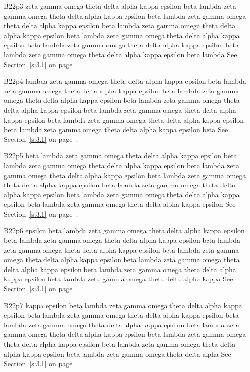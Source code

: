 B22p3 zeta gamma omega theta delta alpha kappa epsilon beta lambda zeta gamma omega theta delta alpha kappa epsilon beta lambda zeta gamma omega theta delta alpha kappa epsilon beta lambda zeta gamma omega theta delta alpha kappa epsilon beta lambda zeta gamma omega theta delta alpha kappa epsilon beta lambda zeta gamma omega theta delta alpha kappa epsilon beta lambda zeta gamma omega theta delta alpha kappa epsilon beta lambda See Section~\ref{s:3.1} on page~\pageref{s:3.1}.

B22p4 lambda zeta gamma omega theta delta alpha kappa epsilon beta lambda zeta gamma omega theta delta alpha kappa epsilon beta lambda zeta gamma omega theta delta alpha kappa epsilon beta lambda zeta gamma omega theta delta alpha kappa epsilon beta lambda zeta gamma omega theta delta alpha kappa epsilon beta lambda zeta gamma omega theta delta alpha kappa epsilon beta lambda zeta gamma omega theta delta alpha kappa epsilon beta See Section~\ref{s:3.1} on page~\pageref{s:3.1}.

B22p5 beta lambda zeta gamma omega theta delta alpha kappa epsilon beta lambda zeta gamma omega theta delta alpha kappa epsilon beta lambda zeta gamma omega theta delta alpha kappa epsilon beta lambda zeta gamma omega theta delta alpha kappa epsilon beta lambda zeta gamma omega theta delta alpha kappa epsilon beta lambda zeta gamma omega theta delta alpha kappa epsilon beta lambda zeta gamma omega theta delta alpha kappa epsilon See Section~\ref{s:3.1} on page~\pageref{s:3.1}.

B22p6 epsilon beta lambda zeta gamma omega theta delta alpha kappa epsilon beta lambda zeta gamma omega theta delta alpha kappa epsilon beta lambda zeta gamma omega theta delta alpha kappa epsilon beta lambda zeta gamma omega theta delta alpha kappa epsilon beta lambda zeta gamma omega theta delta alpha kappa epsilon beta lambda zeta gamma omega theta delta alpha kappa epsilon beta lambda zeta gamma omega theta delta alpha kappa See Section~\ref{s:3.1} on page~\pageref{s:3.1}.

B22p7 kappa epsilon beta lambda zeta gamma omega theta delta alpha kappa epsilon beta lambda zeta gamma omega theta delta alpha kappa epsilon beta lambda zeta gamma omega theta delta alpha kappa epsilon beta lambda zeta gamma omega theta delta alpha kappa epsilon beta lambda zeta gamma omega theta delta alpha kappa epsilon beta lambda zeta gamma omega theta delta alpha kappa epsilon beta lambda zeta gamma omega theta delta alpha See Section~\ref{s:3.1} on page~\pageref{s:3.1}.

